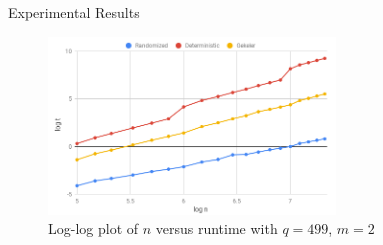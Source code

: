 \documentclass{beamer}
\begin{document}


    


\begin{frame}{Experimental Results}

\begin{figure}[h!]\label{fig:ntest499}
\centering
  \includegraphics[width=3in]{chart-499-2.png}
  \caption{Log-log plot of $n$ versus runtime with $q = 499$, $m = 2$}
\end{figure}
    
\end{frame}





\end{document}

